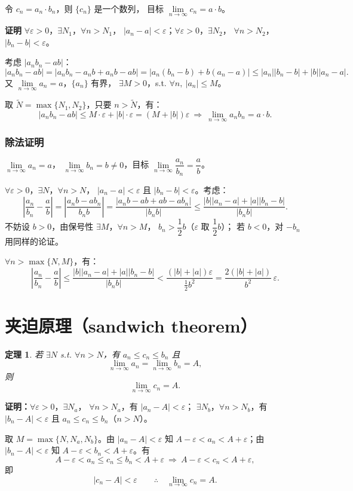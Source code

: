 \documentclass[UTF8,11pt]{ctexart}
\theoremstyle{cnthm}
\newtheorem{thm}{定理}[section]
\begin{document}
令 $c_n=a_n\cdot b_n$，则 $\{c_n\}$ 是一个数列，
目标 $\lim\limits_{n\to\infty}c_n=a\cdot b$。

\textbf{证明}\quad
$\forall\varepsilon>0$，$\exists N_1$，$\forall n>N_1$，
$|a_n-a|<\varepsilon$；$\forall\varepsilon>0$，$\exists N_2$，
$\forall n>N_2$，$|b_n-b|<\varepsilon$。

考虑 $|a_nb_n-ab|$：
\[
|a_nb_n-ab|
=|a_nb_n-a_nb+a_nb-ab|
=|a_n(b_n-b)+b(a_n-a)|
\leq|a_n||b_n-b|+|b||a_n-a| .
\]
又 $\lim\limits_{n\to\infty}a_n=a$，$\{a_n\}$ 有界，
$\exists M>0$，s.t. $\forall n,\ |a_n|\leq M$。

取 $\tilde N=\max\{N_1,N_2\}$，只要 $n>\tilde N$，有：
\[
|a_nb_n-ab|\leq M\cdot\varepsilon+|b|\cdot\varepsilon
=(M+|b|)\varepsilon
\ \Longrightarrow\
\lim_{n\to\infty}a_nb_n=a\cdot b .
\]

\subsubsection*{除法证明}

$\lim\limits_{n\to\infty}a_n=a$，
$\lim\limits_{n\to\infty}b_n=b\neq0$，目标
$\lim\limits_{n\to\infty}\dfrac{a_n}{b_n}=\dfrac ab$。

$\forall\varepsilon>0$，$\exists N$，$\forall n>N$，
$|a_n-a|<\varepsilon$ 且 $|b_n-b|<\varepsilon$。考虑：
\[
\left|\frac{a_n}{b_n}-\frac ab\right|
=\left|\frac{a_nb-ab_n}{b_nb}\right|
=\frac{|a_nb-ab+ab-ab_n|}{|b_nb|}
\leq\frac{|b||a_n-a|+|a||b_n-b|}{|b_nb|} .
\]
不妨设 $b>0$，由保号性 $\exists M$，$\forall n>M$，
$b_n>\dfrac12b$（$\varepsilon$ 取 $\dfrac12b$）；
若 $b<0$，对 $-b_n$ 用同样的论证。

$\forall n>\max\{N,M\}$，有：
\[
\left|\frac{a_n}{b_n}-\frac ab\right|
\leq\frac{|b||a_n-a|+|a||b_n-b|}{|b_nb|}
<\frac{(|b|+|a|)\varepsilon}{\frac12b^2}
=\frac{2(|b|+|a|)}{b^2}\,\varepsilon .
\]

\section{夹迫原理（sandwich theorem）}

\begin{thm}
若 $\exists N$ s.t. $\forall n>N$，有
$a_n\leq c_n\leq b_n$ 且
\[
\lim_{n\to\infty}a_n=\lim_{n\to\infty}b_n=A,
\]
则
\[
\lim_{n\to\infty}c_n=A .
\]
\end{thm}

\textbf{证明：}\quad $\forall\varepsilon>0$，$\exists N_a$，
$\forall n>N_a$，有 $|a_n-A|<\varepsilon$；
$\exists N_b$，$\forall n>N_b$，有 $|b_n-A|<\varepsilon$
且 $a_n\leq c_n\leq b_n$（$n>N$）。

取 $M=\max\{N,N_a,N_b\}$。由 $|a_n-A|<\varepsilon$ 知
$A-\varepsilon<a_n<A+\varepsilon$；由 $|b_n-A|<\varepsilon$ 知
$A-\varepsilon<b_n<A+\varepsilon$。有
\[
A-\varepsilon<a_n\leq c_n\leq b_n<A+\varepsilon
\ \Longrightarrow\
A-\varepsilon<c_n<A+\varepsilon,
\]
即
\[
|c_n-A|<\varepsilon
\qquad\therefore\quad
\lim_{n\to\infty}c_n=A .
\]
\end{document}
